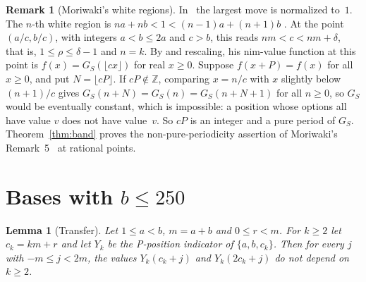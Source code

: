 \documentclass[11pt]{amsart}
\newtheorem{lemma}[theorem]{Lemma}
\theoremstyle{definition}
\newtheorem{remark}[theorem]{Remark}
\numberwithin{equation}{section}
\begin{document}
\begin{remark}[Moriwaki's white regions]\label{rem:moriwaki}
In~\cite{Moriwaki} the largest move is normalized to~$1$. The $n$-th white region is
$na+nb<1<(n-1)a+(n+1)b$ \cite[Thm.~3]{Moriwaki}. At the point $(a/c,b/c)$, with integers
$a<b\le2a$ and $c>b$, this reads $nm<c<nm+\delta$, that is, $1\le\rho\le\delta-1$ and $n=k$.
By \cite[Prop.~2]{Moriwaki} and rescaling, his nim-value function at this point is
$f(x)=G_S(\lfloor cx\rfloor)$ for real $x\ge0$. Suppose $f(x+P)=f(x)$ for all $x\ge0$, and
put $N=\lfloor cP\rfloor$. If $cP\notin\mathbb{Z}$, comparing $x=n/c$ with $x$ slightly below
$(n+1)/c$ gives $G_S(n+N)=G_S(n)=G_S(n+N+1)$ for all $n\ge0$, so $G_S$ would be eventually
constant, which is impossible: a position whose options all have value $v$ does not
have value~$v$. So $cP$ is an integer and a pure period of $G_S$. Theorem~\ref{thm:band}
proves the non-pure-periodicity assertion of Moriwaki's Remark~5~\cite{Moriwaki} at rational
points.
\end{remark}

\section{Bases with \texorpdfstring{$b\le 250$}{b <= 250}}

\begin{lemma}[Transfer]\label{lem:transfer}
Let $1\le a<b$, $m=a+b$ and $0\le r<m$. For $k\ge2$ let $c_k=km+r$ and let $Y_k$ be the
P-position indicator of $\{a,b,c_k\}$. Then for every $j$ with $-m\le j<2m$, the values
$Y_k(c_k+j)$ and $Y_k(2c_k+j)$ do not depend on $k\ge2$.
\end{lemma}
\end{document}

